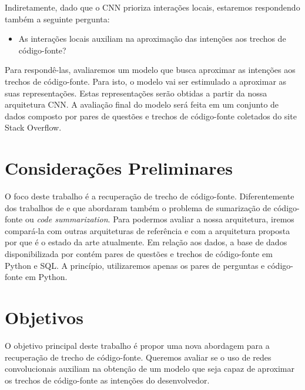 Indiretamente, dado que o CNN prioriza interações locais, estaremos respondendo também a seguinte pergunta:
\begin{itemize}
        \item As interações locais auxiliam na aproximação das intenções aos trechos de código-fonte?
\end{itemize}

Para respondê-las, avaliaremos um modelo que busca aproximar as intenções aos trechos de código-fonte. Para isto, o modelo vai ser estimulado a aproximar as suas representações. Estas representações serão obtidas a partir da nossa arquitetura CNN. A avaliação final do modelo será feita em um conjunto de dados composto por pares de questões e trechos de código-fonte coletados do site Stack Overflow. 


\section{Considerações Preliminares}
\label{sec:consideracoes_preliminares}

O foco deste trabalho é a recuperação de trecho de código-fonte. Diferentemente dos trabalhos de \cite{iyer-etal-2016-summarizing} e \cite{Allamanis-bimodal-source-code-natural-language:2015} que abordaram também o problema de sumarização de código-fonte ou \textit{code summarization}. Para podermos avaliar a nossa arquitetura, iremos compará-la com outras arquiteturas de referência e com a arquitetura proposta por \cite{cambronero-deep-learning-code-search:2019} que é o estado da arte atualmente. Em relação aos dados, a base de dados disponibilizada por \cite{yao-2018} contém pares de questões e trechos de código-fonte em Python e SQL. A princípio, utilizaremos apenas os pares de perguntas e código-fonte em Python.


\section{Objetivos}
\label{sec:objetivo}

O objetivo principal deste trabalho é propor uma nova abordagem para a recuperação de trecho de código-fonte. Queremos avaliar se o uso de redes convolucionais auxiliam na obtenção de um modelo que seja capaz de aproximar os trechos de código-fonte as intenções do desenvolvedor.

